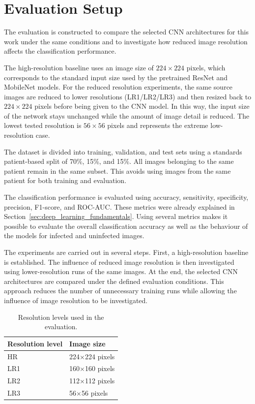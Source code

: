 {\FloatBarrier

\section{Evaluation Setup}

The evaluation is constructed to compare the selected CNN architectures for this work under the same conditions and to investigate how reduced image resolution affects the classification performance.

The high-resolution baseline uses an image size of \(224 \times 224\) pixels, which corresponds to the standard input size used by the pretrained ResNet and MobileNet models. For the reduced resolution experiments, the same source images are reduced to lower resolutions (LR1/LR2/LR3) and then resized back to \(224 \times 224\) pixels before being given to the CNN model. In this way, the input size of the network stays unchanged while the amount of image detail is reduced. The lowest tested resolution is \(56 \times 56\) pixels and represents the extreme low-resolution case.

The dataset is divided into training, validation, and test sets using a standards patient-based split of 70\%, 15\%, and 15\%. All images belonging to the same patient remain in the same subset. This avoids using images from the same patient for both training and evaluation.

The classification performance is evaluated using accuracy, sensitivity, specificity, precision, F1-score, and ROC-AUC. These metrics were already explained in Section~\ref{sec:deep_learning_fundamentals}. Using several metrics makes it possible to evaluate the overall classification accuracy as well as the behaviour of the models for infected and uninfected images.

The experiments are carried out in several steps. First, a high-resolution baseline is established. The influence of reduced image resolution is then investigated using lower-resolution runs of the same images. At the end, the selected CNN architectures are compared under the defined evaluation conditions. This approach reduces the number of unnecessary training runs while allowing the influence of image resolution to be investigated.

\captionsetup[table]{skip=2pt}
\begin{table}[htbp]
\centering
\caption{Resolution levels used in the evaluation.}
\label{tab:resolution_levels}
\begin{tabularx}{\textwidth}{|p{3cm}|X|}
\hline
\textbf{Resolution level} & \textbf{Image size} \\
\hline
HR & 224$\times$224 pixels \\
\hline
LR1 & 160$\times$160 pixels \\
\hline
LR2 & 112$\times$112 pixels \\
\hline
LR3 & 56$\times$56 pixels \\
\hline
\end{tabularx}
\end{table}

}
